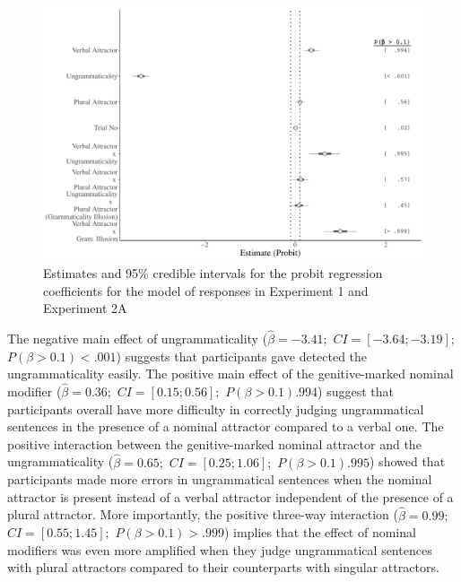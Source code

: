 \begin{knitrout}
\color{fgcolor}\begin{figure}[hbt!]

{\centering \includegraphics[width=\linewidth]{figure/exp2BayesPool-1} 

}

\caption[Estimates and 95\% credible intervals for the probit regression coefficients for the model of responses in Experiment 1 and Experiment 2A]{Estimates and 95\% credible intervals for the probit regression coefficients for the model of responses in Experiment 1 and Experiment 2A}\label{fig:exp2BayesPool}
\end{figure}

\end{knitrout}
The negative main effect of ungrammaticality ($\hat{\beta}=-3.41;$ $CI=[-3.64; -3.19];$ $P(\beta>0.1)< .001$) suggests that participants gave detected the ungrammaticality easily. The positive main effect of the genitive-marked nominal modifier ($\hat{\beta}=0.36;$ $CI=[0.15; 0.56];$ $P(\beta>0.1)  .994$) suggest that participants overall have more difficulty in correctly judging ungrammatical sentences in the presence of a nominal attractor compared to a verbal one. The positive interaction between the genitive-marked nominal attractor and the ungrammaticality ($\hat{\beta}=0.65;$ $CI=[0.25; 1.06];$ $P(\beta>0.1)  .995$) showed that participants made more errors in ungrammatical sentences when the nominal attractor is present instead of a verbal attractor independent of the presence of a plural attractor. More importantly, the positive three-way interaction ($\hat{\beta}=0.99;$ $CI=[0.55; 1.45];$ $P(\beta>0.1)> .999$) implies that the effect of nominal modifiers was even more amplified when they judge ungrammatical sentences with plural attractors compared to their counterparts with singular attractors. 


